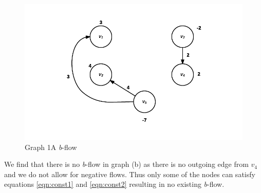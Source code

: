 \begin{figure}[ht]
  \centering
  \includegraphics[scale=0.7]{images/1a_solved.png}
  \caption{Graph 1A \textit{b}-flow}
  \label{fig:1a-solved}
\end{figure}

We find that there is no \textit{b}-flow in graph (b) as there is no outgoing edge from \(v_4\) and we do not allow for negative flows. Thus only some of the nodes can satisfy equations \eqref{eqn:const1} and \eqref{eqn:const2} resulting in no existing \textit{b}-flow.

